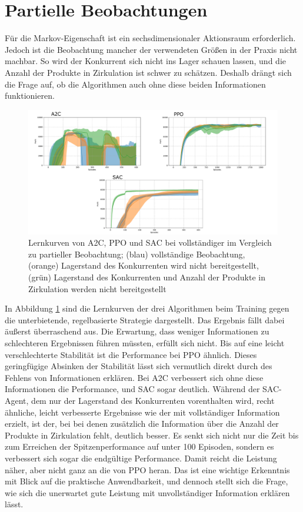 \section{Partielle Beobachtungen}
Für die Markov-Eigenschaft ist ein sechsdimensionaler Aktionsraum erforderlich.
Jedoch ist die Beobachtung mancher der verwendeten Größen in der Praxis nicht machbar.
So wird der Konkurrent sich nicht ins Lager schauen lassen, und die Anzahl der Produkte in Zirkulation ist schwer zu schätzen.
Deshalb drängt sich die Frage auf, ob die Algorithmen auch ohne diese beiden Informationen funktionieren.

\begin{figure}[htbp]
	\centering
	\includegraphics[width=\textwidth]{main/partial_observation.pdf}
	\caption{Lernkurven von A2C, PPO und SAC bei vollständiger im Vergleich zu partieller Beobachtung; (blau) vollständige Beobachtung, (orange) Lagerstand des Konkurrenten wird nicht bereitgestellt, (grün) Lagerstand des Konkurrenten und Anzahl der Produkte in Zirkulation werden nicht bereitgestellt}
	\label{graphic:PartialObservation}
\end{figure}

In Abbildung \ref{graphic:PartialObservation} sind die Lernkurven der drei Algorithmen beim Training gegen die unterbietende, regelbasierte Strategie dargestellt.
Das Ergebnis fällt dabei äußerst überraschend aus.
Die Erwartung, dass weniger Informationen zu schlechteren Ergebnissen führen müssten, erfüllt sich nicht.
Bis auf eine leicht verschlechterte Stabilität ist die Performance bei PPO ähnlich.
Dieses geringfügige Absinken der Stabilität lässt sich vermutlich direkt durch des Fehlens von Informationen erklären.
Bei A2C verbessert sich ohne diese Informationen die Performance, und SAC sogar deutlich.
Während der SAC-Agent, dem nur der Lagerstand des Konkurrenten vorenthalten wird, recht ähnliche, leicht verbesserte Ergebnisse wie der mit vollständiger Information erzielt, ist der, bei bei denen zusätzlich die Information über die Anzahl der Produkte in Zirkulation fehlt, deutlich besser.
Es senkt sich nicht nur die Zeit bis zum Erreichen der Spitzenperformance auf unter 100 Episoden, sondern es verbessert sich sogar die endgültige Performance.
Damit reicht die Leistung näher, aber nicht ganz an die von PPO heran.
Das ist eine wichtige Erkenntnis mit Blick auf die praktische Anwendbarkeit, und dennoch stellt sich die Frage, wie sich die unerwartet gute Leistung mit unvollständiger Information erklären lässt.


